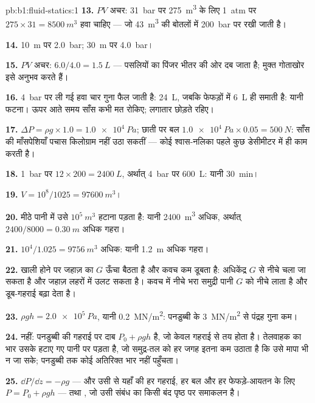 \begin{solution}{pb:b1:fluid-statics:1}
\textbf{13.} $PV$ अचर: \qty{31}{bar} पर \qty{275}{m^3} के लिए \qty{1}{atm} पर $275 \times 31
= \qty{8500}{m^3}$ हवा चाहिए --- जो \qty{43}{m^3} की बोतलों में \qty{200}{bar}
पर रखी जाती है।

\textbf{14.} \qty{10}{m} पर \qty{2.0}{bar}; \qty{30}{m} पर \qty{4.0}{bar}।

\textbf{15.} $PV$ अचर: $6.0/4.0 = \qty{1.5}{L}$ --- पसलियों का पिंजर भीतर की
ओर दब जाता है; मुक्त गोताखोर इसे अनुभव करते हैं।

\textbf{16.} \qty{4}{bar} पर ली गई हवा चार गुना फैल जाती है: \qty{24}{L},
जबकि फेफड़ों में \qty{6}{L} ही समाती है: यानी फटना। ऊपर आते समय साँस कभी मत
रोकिए; लगातार छोड़ते रहिए।

\textbf{17.} $\Delta P = \rho g \times 1.0 = \qty{1.0e4}{Pa}$; छाती पर बल $\qty{1.0e4}{Pa}
\times 0.05 = \qty{500}{N}$: साँस की माँसपेशियाँ पचास किलोग्राम नहीं उठा
सकतीं --- कोई श्वास-नलिका पहले कुछ डेसीमीटर में ही काम करती है।

\textbf{18.} \qty{1}{bar} पर $12 \times 200 = \qty{2400}{L}$, अर्थात् \qty{4}{bar}
पर \qty{600}{L}: यानी \qty{30}{min}।

\textbf{19.} $V = 10^8/1025 = \qty{97600}{m^3}$।

\textbf{20.} मीठे पानी में उसे $10^5\ \unit{m^3}$ हटाना पड़ता है: यानी \qty{2400}{m^3}
अधिक, अर्थात् $2400/8000 = \qty{0.30}{m}$ अधिक गहरा।

\textbf{21.} $10^4/1.025 = \qty{9756}{m^3}$ अधिक: यानी \qty{1.2}{m} अधिक गहरा।

\textbf{22.} खाली होने पर जहाज़ का $G$ ऊँचा बैठता है और कवच कम डूबता है:
अधिकेंद्र $G$ से नीचे चला जा सकता है और जहाज़ लहरों में उलट सकता है। कवच में
नीचे भरा समुद्री पानी $G$ को नीचे लाता है और डूब-गहराई बढ़ा देता है।

\textbf{23.} $\rho gh = \qty{2.0e5}{Pa}$, यानी \qty{0.2}{MN/m^2}: पनडुब्बी के
\qty{3}{MN/m^2} से पंद्रह गुना कम।

\textbf{24.} नहीं: पनडुब्बी की गहराई पर दाब $P_0 + \rho gh$ है, जो केवल
गहराई से तय होता है। तेलवाहक का भार उसके हटाए गए पानी पर पड़ता है, जो
समुद्र-तल को हर जगह इतना कम उठाता है कि उसे मापा भी न जा सके; पनडुब्बी तक
कोई अतिरिक्त भार नहीं पहुँचता।

\textbf{25.} $\dd P/\dd z = -\rho g$ --- और उसी से यहाँ की हर गहराई, हर बल
और हर फेफड़े-आयतन के लिए $P = P_0 + \rho gh$ --- तथा ,
जो उसी संबंध का किसी बंद पृष्ठ पर समाकलन है।
\end{solution}
